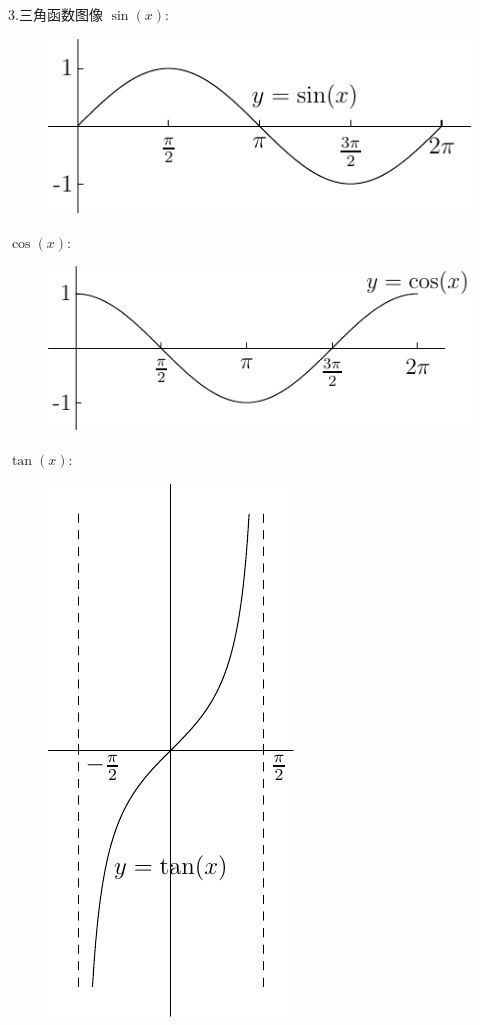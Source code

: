 3.三角函数图像
$\sin(x)$:
\begin{figure}[H]
\centering
\includegraphics{sin.pdf}
\end{figure}
$\cos(x)$:
\begin{figure}[H]
\centering
\includegraphics{cos.pdf}
\end{figure}
$\tan(x)$:
\begin{figure}[H]
\centering
\includegraphics{tan.pdf}
\end{figure}
